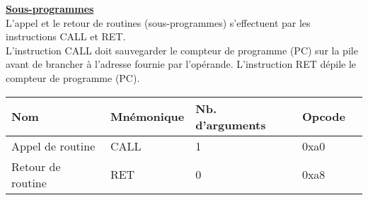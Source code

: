 \documentclass{standalone}
\begin{document}
\begin{minipage}{5in}
\setlength{\parindent}{10pt}
\setlength{\parskip}{3ex plus 0.5ex minus 0.2ex}

\textbf{\underline{Sous-programmes}}\\

L'appel et le retour de routines (sous-programmes) s'effectuent par les instructions CALL et RET.\\

L'instruction CALL doit sauvegarder le compteur de programme (PC) sur la pile avant de brancher à l'adresse fournie par l'opérande. L'instruction RET dépile le compteur de programme (PC).\\

\renewcommand{\arraystretch}{1.2}
\begin{tabular}{@{}lllll@{}}
\toprule
Nom & Mnémonique & Nb. d'arguments & Opcode \\
\toprule
Appel de routine & CALL & 1 & 0xa0 \\
Retour de routine & RET & 0 & 0xa8
\end{tabular}

\end{minipage}
\end{document}
